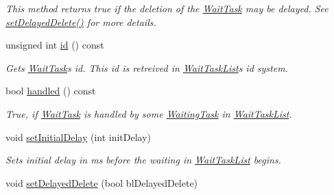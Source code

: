 \begin{DoxyCompactItemize}
\begin{DoxyCompactList}\small\item\em This method returns true if the deletion of the \hyperlink{class_wait_task}{Wait\+Task} may be delayed. See \hyperlink{class_wait_task_a2d90e1b45c8218c8fab89b5adb2dcaae}{set\+Delayed\+Delete()} for more details. \end{DoxyCompactList}\item 
\hypertarget{class_wait_task_a060f5d982d06d90546ca7a23518d09e0}{}unsigned int \hyperlink{class_wait_task_a060f5d982d06d90546ca7a23518d09e0}{id} () const \label{class_wait_task_a060f5d982d06d90546ca7a23518d09e0}

\begin{DoxyCompactList}\small\item\em Gets \hyperlink{class_wait_task}{Wait\+Task}\textquotesingle{}s id. This id is retreived in \hyperlink{class_wait_task_list}{Wait\+Task\+List}\textquotesingle{}s id system. \end{DoxyCompactList}\item 
\hypertarget{class_wait_task_a34687474d76ecdc799c31cf7fd49e01f}{}bool \hyperlink{class_wait_task_a34687474d76ecdc799c31cf7fd49e01f}{handled} () const \label{class_wait_task_a34687474d76ecdc799c31cf7fd49e01f}

\begin{DoxyCompactList}\small\item\em True, if \hyperlink{class_wait_task}{Wait\+Task} is handled by some \hyperlink{class_waiting_task}{Waiting\+Task} in \hyperlink{class_wait_task_list}{Wait\+Task\+List}. \end{DoxyCompactList}\item 
\hypertarget{class_wait_task_aa142fbaa9a075defd892f516083af4b7}{}void \hyperlink{class_wait_task_aa142fbaa9a075defd892f516083af4b7}{set\+Initial\+Delay} (int init\+Delay)\label{class_wait_task_aa142fbaa9a075defd892f516083af4b7}

\begin{DoxyCompactList}\small\item\em Sets initial delay in ms before the waiting in \hyperlink{class_wait_task_list}{Wait\+Task\+List} begins. \end{DoxyCompactList}\item 
\hypertarget{class_wait_task_a2d90e1b45c8218c8fab89b5adb2dcaae}{}void \hyperlink{class_wait_task_a2d90e1b45c8218c8fab89b5adb2dcaae}{set\+Delayed\+Delete} (bool bl\+Delayed\+Delete)\label{class_wait_task_a2d90e1b45c8218c8fab89b5adb2dcaae}


\end{DoxyCompactItemize}
